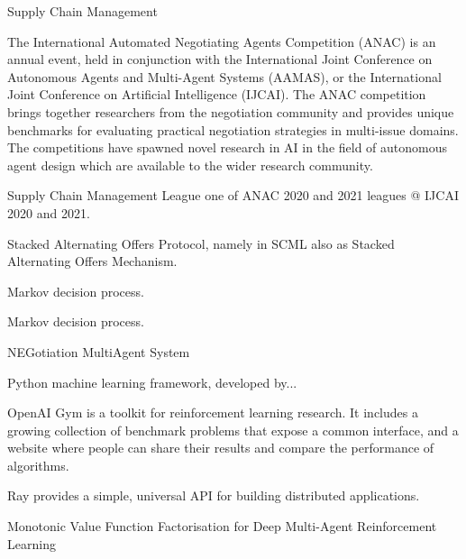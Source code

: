 

%
{%
Supply Chain Management}

%
{%
The International Automated Negotiating Agents Competition (ANAC) is an annual event, held in conjunction with the International Joint Conference on Autonomous Agents and Multi-Agent Systems (AAMAS), or the International Joint Conference on Artificial Intelligence (IJCAI). The ANAC competition brings together researchers from the negotiation community and provides unique benchmarks for evaluating practical negotiation strategies in multi-issue domains. The competitions have spawned novel research in AI in the field of autonomous agent design which are available to the wider research community.
}

%
{%
Supply Chain Management League one of ANAC 2020 and 2021 leagues @ IJCAI 2020 and 2021.}

%
{%
Stacked Alternating Offers Protocol, namely in SCML also as Stacked Alternating Offers Mechanism.
}

%
{%
Markov decision process.
}

%
{%
Markov decision process.
}

%
{%
NEGotiation MultiAgent System
}

%
{%
Python machine learning framework, developed by...
}

%
{%
OpenAI Gym is a toolkit for reinforcement learning research. It includes a growing collection of benchmark problems that expose a common interface, and a website where people can share their results and compare the performance of algorithms.
}

%
{%
Ray provides a simple, universal API for building distributed applications.
}

%
{%
Monotonic Value Function Factorisation for Deep Multi-Agent Reinforcement Learning
}

